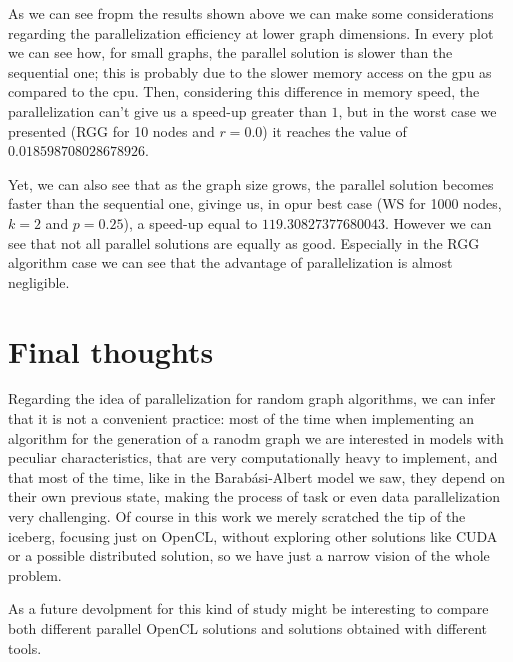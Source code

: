 \documentclass[titlepage]{article}
\begin{document}
As we can see fropm the results shown above we can make some considerations regarding the parallelization efficiency at lower graph dimensions. In every plot we can see how, for small graphs, the parallel solution is slower than the sequential one; this is probably due to the slower memory access on the gpu as compared to the cpu. Then, considering this difference in memory speed, the parallelization can't give us a speed-up greater than $1$, but in the worst case we presented (RGG for 10 nodes and $r=0.0$) it reaches the value of $0.018598708028678926$.

Yet, we can also see that as the graph size grows, the parallel solution becomes faster than the sequential one, givinge us, in opur best case (WS for 1000 nodes, $k=2$ and $p=0.25$), a speed-up equal to $119.30827377680043$. However we can see that not all parallel solutions are equally as good. Especially in the RGG algorithm case we can see that the advantage of parallelization is almost negligible.

\section{Final thoughts}
Regarding the idea of parallelization for random graph algorithms, we can infer that it is not a convenient practice: most of the time when implementing an algorithm for the generation of a ranodm graph we are interested in models with peculiar characteristics, that are very computationally heavy to implement, and that most of the time, like in the Barabási-Albert model we saw, they depend on their own previous state, making the process of task or even data parallelization very challenging. Of course in this work we merely scratched the tip of the iceberg, focusing just on OpenCL, without exploring other solutions like CUDA or a possible distributed solution, so we have just a narrow vision of the whole problem.

As a future devolpment for this kind of study might be interesting to compare both different parallel OpenCL solutions and solutions obtained with different tools.
\end{document}
